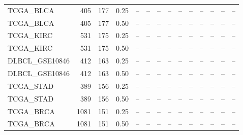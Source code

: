 \begin{table}[!htbp]
{\begin{tabular}{lrrr rrrrr rrr rr}
TCGA\_BLCA & 405 & 177 & 0.25 & -- & -- & -- & -- & -- & -- & -- & -- & -- & -- \\
TCGA\_BLCA & 405 & 177 & 0.50 & -- & -- & -- & -- & -- & -- & -- & -- & -- & -- \\
TCGA\_KIRC & 531 & 175 & 0.25 & -- & -- & -- & -- & -- & -- & -- & -- & -- & -- \\
TCGA\_KIRC & 531 & 175 & 0.50 & -- & -- & -- & -- & -- & -- & -- & -- & -- & -- \\
DLBCL\_GSE10846 & 412 & 163 & 0.25 & -- & -- & -- & -- & -- & -- & -- & -- & -- & -- \\
DLBCL\_GSE10846 & 412 & 163 & 0.50 & -- & -- & -- & -- & -- & -- & -- & -- & -- & -- \\
TCGA\_STAD & 389 & 156 & 0.25 & -- & -- & -- & -- & -- & -- & -- & -- & -- & -- \\
TCGA\_STAD & 389 & 156 & 0.50 & -- & -- & -- & -- & -- & -- & -- & -- & -- & -- \\
TCGA\_BRCA & 1081 & 151 & 0.25 & -- & -- & -- & -- & -- & -- & -- & -- & -- & -- \\
TCGA\_BRCA & 1081 & 151 & 0.50 & -- & -- & -- & -- & -- & -- & -- & -- & -- & -- \\
\bottomrule
\end{tabular}}
\end{table}
